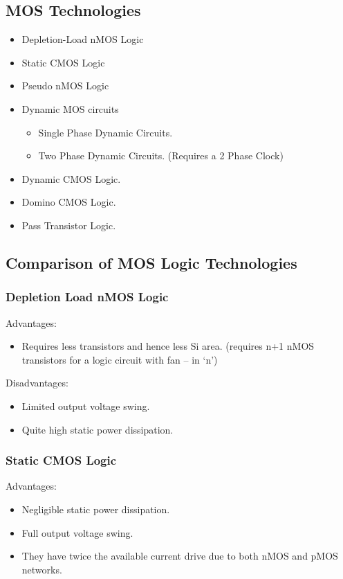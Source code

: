 \documentclass[12pt, letterpaper]{article}
\begin{document}
\subsection{MOS Technologies}
\begin{itemize}
    \item Depletion-Load nMOS Logic
    \item Static CMOS Logic
    \item Pseudo nMOS Logic
    \item Dynamic MOS circuits
    \begin{itemize}
        \item Single Phase Dynamic Circuits.
        \item Two Phase Dynamic Circuits. (Requires a 2 Phase Clock)
    \end{itemize}
    \item Dynamic CMOS Logic.
    \item Domino CMOS Logic.
    \item Pass Transistor Logic.
\end{itemize}

\subsection{Comparison of MOS Logic Technologies}

\subsubsection{Depletion Load nMOS Logic}
Advantages:
\begin{itemize}
    \item Requires less transistors and hence less Si area. (requires n+1 nMOS transistors for a logic circuit with fan – in ‘n’)
\end{itemize}

Disadvantages:
\begin{itemize}
    \item Limited output voltage swing.
    \item Quite high static power dissipation.
\end{itemize}

\subsubsection{Static CMOS Logic}

Advantages:
\begin{itemize}
    \item Negligible static power dissipation.
    \item Full output voltage swing.
    \item They have twice the available current drive due to both nMOS and pMOS networks.
\end{itemize}
\end{document}
